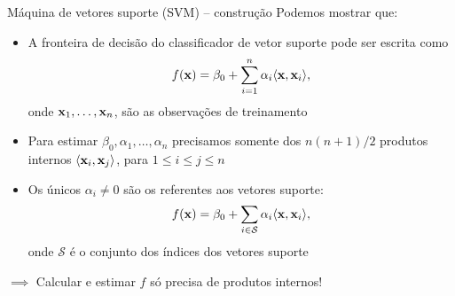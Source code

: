 \begin{frame}{Máquina de vetores suporte (SVM) -- construção}
    Podemos mostrar que:
    \begin{itemize}
        \item A fronteira de decisão do classificador de vetor suporte pode ser escrita como $$f({\bf x}) = \beta_0 + \sum_{i = 1}^{n} \alpha_i \langle {\bf x}, {\bf x}_i\rangle,$$ onde ${\bf x}_1, \dots, {\bf x}_n$, são as observações de treinamento
        
        \pause
        
        \item Para estimar $\beta_0, \alpha_1, \dots, \alpha_n$ precisamos somente dos $n(n+1)/2$ produtos internos $\langle {\bf x}_i, {\bf x}_j \rangle$, para $1 \leq i \leq j \leq n$
        
        \pause
        
        \item Os únicos $\alpha_i \neq 0$ são os referentes aos vetores suporte: \pause $$f({\bf x}) = \beta_0 + \sum_{i \in \mathcal{S}} \alpha_i \langle {\bf x}, {\bf x}_i\rangle,$$ onde $\mathcal{S}$ é o conjunto dos índices dos vetores suporte
    \end{itemize}
    
    \pause
    
    \begin{center}
        $\implies$ Calcular e estimar $f$ só precisa de produtos internos!
    \end{center}
\end{frame}



